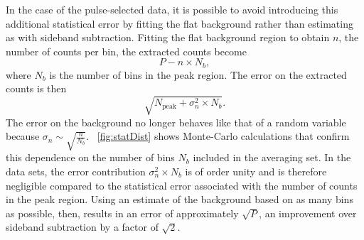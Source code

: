 In the case of the pulse-selected data, it is possible to avoid introducing this additional statistical error by fitting the flat background rather than estimating as with sideband subtraction.  Fitting the flat background region to obtain $n$, the number of counts per bin, the extracted counts become
\begin{equation}
P - n\times N_b,
\end{equation}
where $N_b$ is the number of bins in the peak region.  The error on the extracted counts is then
\begin{equation}
\sqrt{N_{\text{peak}} + {\sigma}_n^2\times N_b}.
\end{equation}
The error on the background no longer behaves like that of a random variable because $\sigma_n\sim\sqrt{\frac{n}{N_b}}$.  \fig~\ref{fig:statDist} shows Monte-Carlo calculations that confirm this dependence on the number of bins $N_b$ included in the averaging set.  In the \reaction data sets, the error contribution ${\sigma}_n^2\times N_b$ is of order unity and is therefore negligible compared to the statistical error associated with the number of counts in the peak region.  Using an estimate of the background based on as many bins as possible, then, results in an error of approximately $\sqrt{P}$, an improvement over sideband subtraction by a factor of $\sqrt{2}$.
